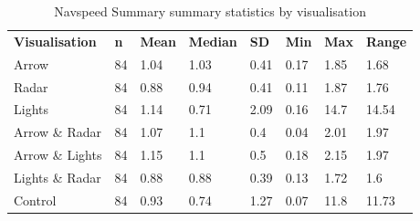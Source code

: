 \begin{table}[]
\caption{Navspeed Summary summary statistics by visualisation}
\label{tab:NavSpeed_Summary}
\begin{tabular}{llllllll}
\textbf{Visualisation} & \textbf{n} & \textbf{Mean} & \textbf{Median} & \textbf{SD} & \textbf{Min} & \textbf{Max} & \textbf{Range} \\
Arrow                  & 84         & 1.04          & 1.03            & 0.41        & 0.17         & 1.85         & 1.68 \\
Radar                  & 84         & 0.88          & 0.94            & 0.41        & 0.11         & 1.87         & 1.76 \\
Lights                 & 84         & 1.14          & 0.71            & 2.09        & 0.16         & 14.7         & 14.54 \\
Arrow \& Radar         & 84         & 1.07          & 1.1             & 0.4         & 0.04         & 2.01         & 1.97 \\
Arrow \& Lights        & 84         & 1.15          & 1.1             & 0.5         & 0.18         & 2.15         & 1.97 \\
Lights \& Radar        & 84         & 0.88          & 0.88            & 0.39        & 0.13         & 1.72         & 1.6 \\
Control                & 84         & 0.93          & 0.74            & 1.27        & 0.07         & 11.8         & 11.73
\end{tabular}
\end{table}
